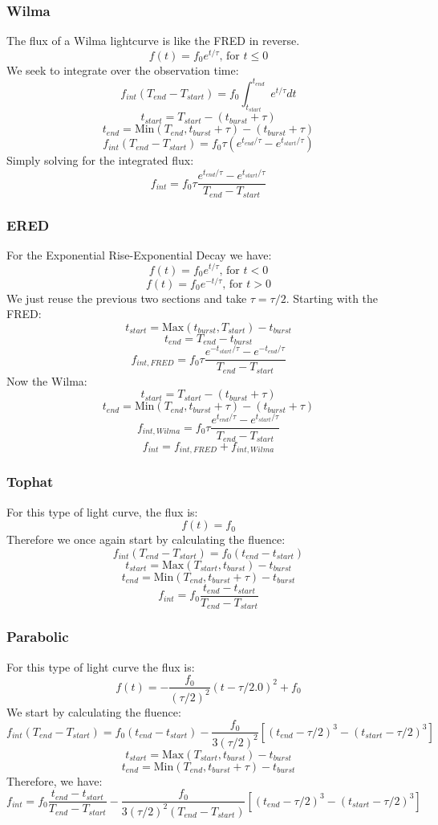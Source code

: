 \documentclass{article}
\begin{document}
\subsubsection{Wilma}
The flux of a Wilma lightcurve is like the FRED in reverse. 
\[f(t)=f_0e^{t/\tau}\text{, for }t\leq0\]
We seek to integrate over the observation time:
\[f_{int}(T_{end}-T_{start}) = f_0\int_{t_{start}}^{t_{end}}e^{t/\tau}dt\]
\[t_{start} =  T_{start} - (t_{burst}+\tau)\]
\[t_{end} = \text{Min}(T_{end},t_{burst}+\tau) - (t_{burst}+\tau)\]
\[f_{int}(T_{end}-T_{start}) = f_0\tau (e^{t_{end}/\tau}-e^{t_{start}/\tau})\]
Simply solving for the integrated flux:
\[f_{int} = f_0\tau \frac{e^{t_{end}/\tau}-e^{t_{start}/\tau}}{T_{end}-T_{start}}\]
\subsubsection{ERED}
For the Exponential Rise-Exponential Decay we have:
\[f(t)=f_0e^{t/\tau}\text{, for }t<0\]
\[f(t)=f_0e^{-t/\tau}\text{, for }t>0\]
We just reuse the previous two sections and take $\tau = \tau/2$. Starting with the FRED:
\[t_{start} = \text{Max}(t_{burst}, T_{start}) - t_{burst}\]
\[t_{end} = T_{end} - t_{burst}\]
\[f_{int, FRED} = f_0\tau \frac{e^{-t_{start}/\tau}-e^{-t_{end}/\tau}}{T_{end}-T_{start}}\]
Now the Wilma:
\[t_{start} =  T_{start} - (t_{burst}+\tau)\]
\[t_{end} = \text{Min}(T_{end},t_{burst}+\tau) - (t_{burst}+\tau)\]
\[f_{int, Wilma} = f_0\tau \frac{e^{t_{end}/\tau}-e^{t_{start}/\tau}}{T_{end}-T_{start}}\]
\[f_{int} = f_{int, FRED} + f_{int, Wilma}\]
\subsubsection{Tophat}
For this type of light curve, the flux is:
\[f(t) = f_0\]
Therefore we once again start by calculating the fluence:
\[f_{int} (T_{end}-T_{start}) = f_0 (t_{end}-t_{start})\]
\[t_{start} =  \text{Max}(T_{start},t_{burst}) - t_{burst}\]
\[t_{end} = \text{Min}(T_{end},t_{burst}+\tau) - t_{burst}\]
\[f_{int}  = f_0 \frac{t_{end}-t_{start}}{T_{end}-T_{start}}\]
\subsubsection{Parabolic}
For this type of light curve the flux is:
\[f(t) = -\frac{f_0}{(\tau/2)^2}(t-\tau/2.0)^2 + f_0\]
We start by calculating the fluence:
\[f_{int}(T_{end}-T_{start}) = f_0(t_{end} - t_{start}) - \frac{f_0}{3(\tau/2)^2}[(t_{end}-\tau/2)^3 - (t_{start}- \tau/2)^3]\]
\[t_{start} =  \text{Max}(T_{start},t_{burst}) - t_{burst}\]
\[t_{end} = \text{Min}(T_{end},t_{burst}+\tau) - t_{burst}\]
Therefore, we have:
\[f_{int} = f_0\frac{t_{end} - t_{start}}{T_{end}-T_{start}} - \frac{f_0}{3(\tau/2)^2(T_{end}-T_{start})}[(t_{end}-\tau/2)^3 - (t_{start}- \tau/2)^3]\]
\end{document}
